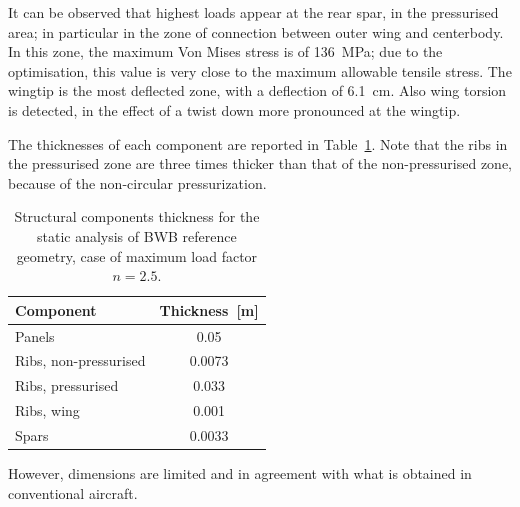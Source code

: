 It can be observed that highest loads appear at the rear spar, in the pressurised area; in particular in the zone of connection between outer wing and centerbody. 
In this zone, the maximum Von Mises stress is of 136~\si{\mega\pascal}; due to the optimisation, this value is very close to the maximum allowable tensile stress. 
The wingtip is the most deflected zone, with a deflection of 6.1~\si{\centi\meter}.
Also wing torsion is detected, in the effect of a twist down more pronounced at the wingtip. 

The thicknesses of each component are reported in Table~\ref{tab:bwb_structure_thickness_results}.
Note that the ribs in the pressurised zone are three times thicker than that of the non-pressurised zone, because of the non-circular pressurization. 
\begin{table}[!h]
	\centering
	\begin{tabular}{l c}
		\hline
		\textbf{Component} & \textbf{Thickness~[\si{\meter}]} \\
		\hline
		Panels & 0.05 \\
		Ribs, non-pressurised & 0.0073 \\
		Ribs, pressurised & 0.033 \\
		Ribs, wing & 0.001 \\
		Spars & 0.0033 \\
		\hline
	\end{tabular}
	\caption{Structural components thickness for the static analysis of BWB reference geometry, case of maximum load factor $n=2.5$.}
	\label{tab:bwb_structure_thickness_results}
\end{table}
However, dimensions are limited and in agreement with what is obtained in conventional aircraft. 


